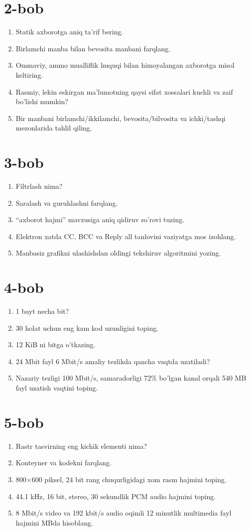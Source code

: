 \documentclass[11pt,a4paper,oneside]{book}
\begin{document}
\section*{2-bob}
\begin{enumerate}
\item[A.] Statik axborotga aniq ta'rif bering.
\item[B.] Birlamchi manba bilan bevosita manbani farqlang.
\item[C.] Ommaviy, ammo mualliflik huquqi bilan himoyalangan axborotga misol keltiring.
\item[D.] Rasmiy, lekin eskirgan ma'lumotning qaysi sifat xossalari kuchli va zaif bo'lishi mumkin?
\item[E.] Bir manbani birlamchi/ikkilamchi, bevosita/bilvosita va ichki/tashqi mezonlarida tahlil qiling.
\end{enumerate}
\section*{3-bob}
\begin{enumerate}
\item[A.] Filtrlash nima?
\item[B.] Saralash va guruhlashni farqlang.
\item[C.] ``axborot hajmi'' mavzusiga aniq qidiruv so'rovi tuzing.
\item[D.] Elektron xatda CC, BCC va Reply all tanlovini vaziyatga mos izohlang.
\item[E.] Manbasiz grafikni ulashishdan oldingi tekshiruv algoritmini yozing.
\end{enumerate}
\section*{4-bob}
\begin{enumerate}
\item[A.] 1 bayt necha bit?
\item[B.] 30 holat uchun eng kam kod uzunligini toping.
\item[C.] 12 KiB ni bitga o'tkazing.
\item[D.] 24 Mbit fayl 6 Mbit/s amaliy tezlikda qancha vaqtda uzatiladi?
\item[E.] Nazariy tezligi 100 Mbit/s, samaradorligi 72\% bo'lgan kanal orqali 540 MB fayl uzatish vaqtini toping.
\end{enumerate}
\section*{5-bob}
\begin{enumerate}
\item[A.] Rastr tasvirning eng kichik elementi nima?
\item[B.] Konteyner va kodekni farqlang.
\item[C.] 800$\times$600 piksel, 24 bit rang chuqurligidagi xom rasm hajmini toping.
\item[D.] 44.1 kHz, 16 bit, stereo, 30 sekundlik PCM audio hajmini toping.
\item[E.] 8 Mbit/s video va 192 kbit/s audio oqimli 12 minutlik multimedia fayl hajmini MBda hisoblang.
\end{enumerate}
\end{document}
